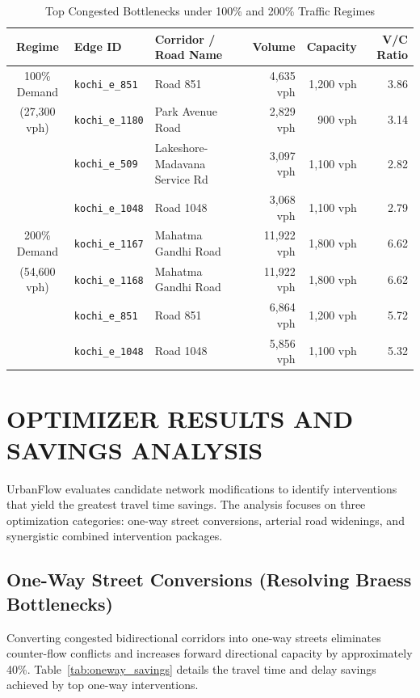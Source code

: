 \documentclass[12pt,a4paper]{report}
\begin{document}
\begin{table}[H]
\centering
\caption{Top Congested Bottlenecks under 100\% and 200\% Traffic Regimes}
\label{tab:bottlenecks}
\vspace{0.15cm}
\small
\begin{tabularx}{\textwidth}{clXrrr}
\toprule
\textbf{Regime} & \textbf{Edge ID} & \textbf{Corridor / Road Name} & \textbf{Volume} & \textbf{Capacity} & \textbf{V/C Ratio} \\
\midrule
100\% Demand & \texttt{kochi\_e\_851}  & Road 851 & 4,635 vph & 1,200 vph & 3.86 \\
(27,300 vph) & \texttt{kochi\_e\_1180} & Park Avenue Road & 2,829 vph & 900 vph & 3.14 \\
             & \texttt{kochi\_e\_509}  & Lakeshore-Madavana Service Rd & 3,097 vph & 1,100 vph & 2.82 \\
             & \texttt{kochi\_e\_1048} & Road 1048 & 3,068 vph & 1,100 vph & 2.79 \\
\midrule
200\% Demand & \texttt{kochi\_e\_1167} & Mahatma Gandhi Road & 11,922 vph & 1,800 vph & 6.62 \\
(54,600 vph) & \texttt{kochi\_e\_1168} & Mahatma Gandhi Road & 11,922 vph & 1,800 vph & 6.62 \\
             & \texttt{kochi\_e\_851}  & Road 851 & 6,864 vph & 1,200 vph & 5.72 \\
             & \texttt{kochi\_e\_1048} & Road 1048 & 5,856 vph & 1,100 vph & 5.32 \\
\bottomrule
\end{tabularx}
\end{table}

\section{OPTIMIZER RESULTS AND SAVINGS ANALYSIS}
UrbanFlow evaluates candidate network modifications to identify interventions that yield the greatest travel time savings. The analysis focuses on three optimization categories: one-way street conversions, arterial road widenings, and synergistic combined intervention packages.

\subsection*{One-Way Street Conversions (Resolving Braess Bottlenecks)}
Converting congested bidirectional corridors into one-way streets eliminates counter-flow conflicts and increases forward directional capacity by approximately 40\%. Table~\ref{tab:oneway_savings} details the travel time and delay savings achieved by top one-way interventions.
\end{document}
